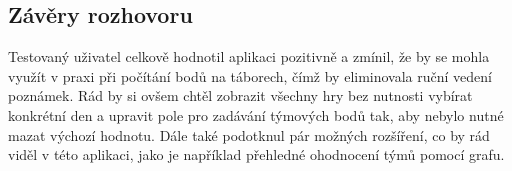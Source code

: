 \documentclass[a4paper, 12pt]{article} %
\begin{document}
\subsection*{Závěry rozhovoru}
Testovaný uživatel celkově hodnotil aplikaci pozitivně a zmínil, že by se mohla využít v 
praxi při počítání bodů na táborech, čímž by eliminovala ruční vedení poznámek.
Rád by si ovšem chtěl zobrazit všechny hry bez nutnosti vybírat konkrétní den a upravit 
pole pro zadávání týmových bodů tak, aby nebylo nutné mazat výchozí hodnotu. Dále také podotknul
pár možných rozšíření, co by rád viděl v této aplikaci, jako je například přehledné ohodnocení týmů 
pomocí grafu.
\end{document}
